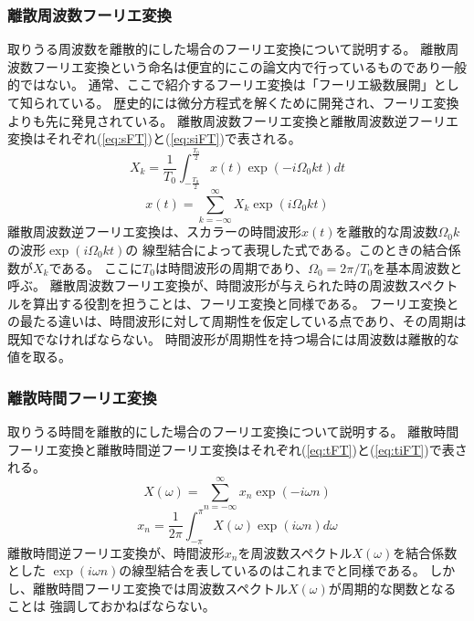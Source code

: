 \subsubsection{\mc 離散周波数フーリエ変換}
取りうる周波数を離散的にした場合のフーリエ変換について説明する。
離散周波数フーリエ変換という命名は便宜的にこの論文内で行っているものであり一般的ではない。
通常、ここで紹介するフーリエ変換は「フーリエ級数展開」として知られている。
歴史的には微分方程式を解くために開発され、フーリエ変換よりも先に発見されている。
離散周波数フーリエ変換と離散周波数逆フーリエ変換はそれぞれ(\ref{eq:sFT})と(\ref{eq:siFT})で表される。
\begin{equation}
    X_k=\frac{1}{T_0}\int_{-\frac{T_0}{2}}^{\frac{T_0}{2}} x(t)\exp(-i\Omega_0 kt)dt
    \label{eq:sFT}
\end{equation}
\begin{equation}
    x(t)=\sum_{k=-\infty}^{\infty} X_k \exp(i\Omega_0 k t)
    \label{eq:siFT}
\end{equation}
離散周波数逆フーリエ変換は、スカラーの時間波形\(x(t)\)を離散的な周波数\(\Omega_0 k\)の波形\(\exp(i\Omega_0 k t)\)の
線型結合によって表現した式である。このときの結合係数が\(X_k\)である。
ここに\(T_0\)は時間波形の周期であり、\(\Omega_0 = 2\pi/T_0\)を基本周波数と呼ぶ。
離散周波数フーリエ変換が、時間波形が与えられた時の周波数スペクトルを算出する役割を担うことは、フーリエ変換と同様である。
フーリエ変換との最たる違いは、時間波形に対して周期性を仮定している点であり、その周期は既知でなければならない。
時間波形が周期性を持つ場合には周波数は離散的な値を取る。

\subsubsection{\mc 離散時間フーリエ変換}
取りうる時間を離散的にした場合のフーリエ変換について説明する。
離散時間フーリエ変換と離散時間逆フーリエ変換はそれぞれ(\ref{eq:tFT})と(\ref{eq:tiFT})で表される。
\begin{equation}
    X(\omega)=\sum_{n = -\infty}^{\infty} x_n \exp(-i\omega n)
    \label{eq:tFT}
\end{equation}
\begin{equation}
    x_n=\frac{1}{2\pi} \int_{-\pi}^{\pi} X(\omega) \exp(i\omega n)d\omega
    \label{eq:tiFT}
\end{equation}
離散時間逆フーリエ変換が、時間波形\(x_n\)を周波数スペクトル\(X(\omega)\)を結合係数とした
\(\exp(i\omega n)\)の線型結合を表しているのはこれまでと同様である。
しかし、離散時間フーリエ変換では周波数スペクトル\(X(\omega)\)が周期的な関数となることは
強調しておかねばならない。

